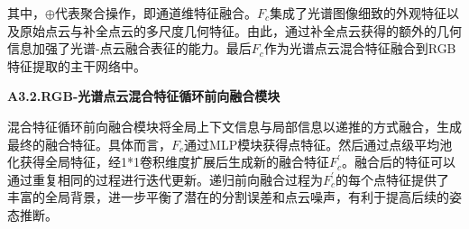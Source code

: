 \documentclass[12pt]{article}
\begin{document}
其中，$\oplus$代表聚合操作，即通道维特征融合。$F_c$集成了光谱图像细致的外观特征以及原始点云与补全点云的多尺度几何特征。由此，通过补全点云获得的额外的几何信息加强了光谱-点云融合表征的能力。最后$F_c$作为光谱点云混合特征融合到RGB特征提取的主干网络中。

\textbf{A3.2.RGB-光谱点云混合特征循环前向融合模块}

混合特征循环前向融合模块将全局上下文信息与局部信息以递推的方式融合，生成最终的融合特征。具体而言，$F_c$通过MLP模块获得点特征。然后通过点级平均池化获得全局特征，经1*1卷积维度扩展后生成新的融合特征$F_c^{\prime}$。融合后的特征可以通过重复相同的过程进行迭代更新。递归前向融合过程为$F_c^{\prime}$的每个点特征提供了丰富的全局背景，进一步平衡了潜在的分割误差和点云噪声，有利于提高后续的姿态推断。







\end{document}
